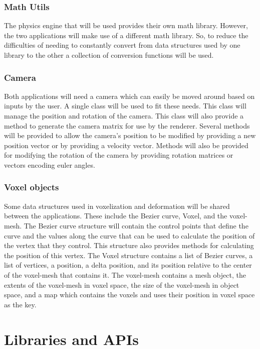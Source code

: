 \subsubsection{Math Utils}

The physics engine that will be used provides their own math library. However, the two applications
will make use of a different math library. So, to reduce the difficulties of needing to constantly
convert from data structures used by one library to the other a collection of conversion functions
will be used. 

\subsubsection{Camera}

Both applications will need a camera which can easily be moved around based on inputs by the user.
A single class will be used to fit these needs. This class will manage the position and rotation
of the camera. This class will also provide a method to generate the camera matrix for use by the
renderer. Several methods will be provided to allow the camera's position to be modified by 
providing a new position vector or by providing a velocity vector. Methods will also be provided for
modifying the rotation of the camera by providing rotation matrices or vectors encoding euler angles.

\subsubsection{Voxel objects} \label{VoxelObjects}

Some data structures used in voxelization and deformation will be shared between the applications.
These include the Bezier curve, Voxel, and the voxel-mesh. The Bezier curve structure will contain
the control points that define the curve and the values along the curve that can be used to 
calculate the position of the vertex that they control. This structure also provides methods for
calculating the position of this vertex. The Voxel structure contains a list of Bezier curves, a 
list of vertices, a position, a delta position, and its position relative to the center of the 
voxel-mesh that contains it. The voxel-mesh contains a mesh object, the extents of the voxel-mesh 
in voxel space, the size of the voxel-mesh in object space, and a map which contains the voxels and
uses their position in voxel space as the key.

\section{Libraries and APIs}

